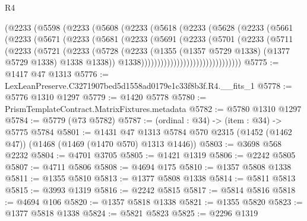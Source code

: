 \begin{lexlean}{R4}
\begin{coremodule}
                  (@2233
                    (@5598
                      (@2233
                        (@5608
                          (@2233
                            (@5618
                              (@2233
                                (@5628
                                  (@2233
                                    (@5661
                                      (@2233
                                        (@5671
                                          (@2233
                                            (@5681
                                              (@2233
                                                (@5691
                                                  (@2233
                                                    (@5701
                                                      (@2233
                                                        (@5711
                                                          (@2233
                                                            (@5721
                                                              (@2233
                                                                (@5728
                                                                  (@2233
                                                                    (@1355
                                                                      (@1357 @5729 @1338)
                                                                      (@1377 @5729 @1338)
                                                                      @1338
                                                                      @1338))
                                                                  @1338)))))))))))))))))))))))))))))))
@5775 := @1417 @47 @1313
@5776 := LexLeanPreserve.C3271907bed5d1558ad0179e1c33f8b3f.R4.__fits_1
@5778 := @5776 @1310 @1297
@5779 := @1420 @5778
@5780 := PrismTemplateContract.MatrixFixtures.metadata
@5782 := @5780 @1310 @1297
@5784 := @5779 (@73 @5782)
@5787 := (ordinal : @34) -> (item : @34) -> @5775 @5784
@5801 := @1431
    @47
    @1313
    @5784
    @570
    @2315
    (@1452 (@1462 @47))
    (@1468 (@1469 (@1470 @570) @1313 @1446))
@5803 := @3698 @568 @2232
@5804 := @4701 @3705
@5805 := @1421 @1319
@5806 := @2242 @5805
@5807 := @4711 @5806
@5808 := @4694 @175
@5810 := @1357 @5808 @1338
@5811 := @1355 @5810
@5813 := @1377 @5808 @1338
@5814 := @5811 @5813
@5815 := @3993 @1319
@5816 := @2242 @5815
@5817 := @5814 @5816
@5818 := @4694 @106
@5820 := @1357 @5818 @1338
@5821 := @1355 @5820
@5823 := @1377 @5818 @1338
@5824 := @5821 @5823
@5825 := @2296 @1319

\end{coremodule}
\end{lexlean}

